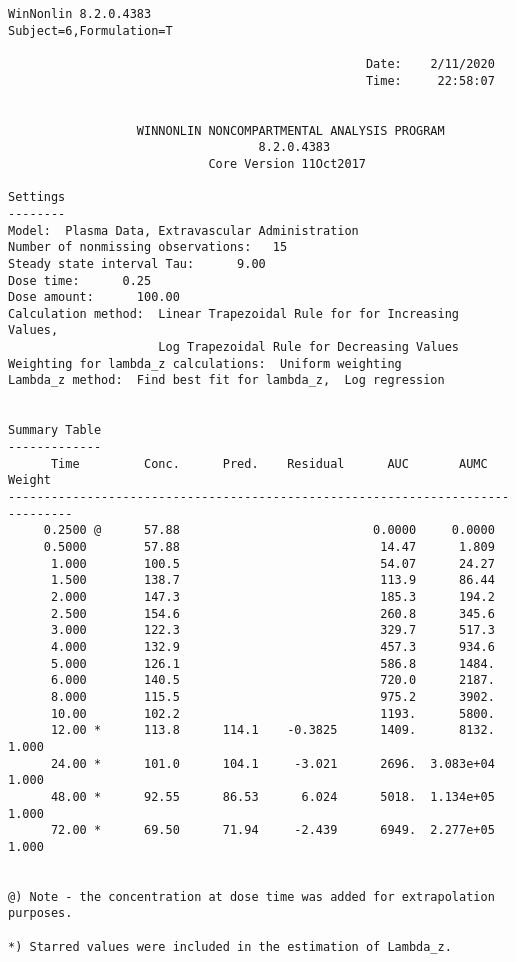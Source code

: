\documentclass[12pt,a4paper]{article}
\begin{document}
\begin{verbatim}
WinNonlin 8.2.0.4383
Subject=6,Formulation=T

                                                  Date:    2/11/2020
                                                  Time:     22:58:07


                  WINNONLIN NONCOMPARTMENTAL ANALYSIS PROGRAM
                                   8.2.0.4383
                            Core Version 11Oct2017

Settings
--------
Model:  Plasma Data, Extravascular Administration
Number of nonmissing observations:   15
Steady state interval Tau:      9.00
Dose time:      0.25
Dose amount:      100.00
Calculation method:  Linear Trapezoidal Rule for for Increasing Values,
                     Log Trapezoidal Rule for Decreasing Values
Weighting for lambda_z calculations:  Uniform weighting
Lambda_z method:  Find best fit for lambda_z,  Log regression


Summary Table
-------------
      Time         Conc.      Pred.    Residual      AUC       AUMC      Weight
-------------------------------------------------------------------------------
     0.2500 @      57.88                           0.0000     0.0000
     0.5000        57.88                            14.47      1.809
      1.000        100.5                            54.07      24.27
      1.500        138.7                            113.9      86.44
      2.000        147.3                            185.3      194.2
      2.500        154.6                            260.8      345.6
      3.000        122.3                            329.7      517.3
      4.000        132.9                            457.3      934.6
      5.000        126.1                            586.8      1484.
      6.000        140.5                            720.0      2187.
      8.000        115.5                            975.2      3902.
      10.00        102.2                            1193.      5800.
      12.00 *      113.8      114.1    -0.3825      1409.      8132.      1.000
      24.00 *      101.0      104.1     -3.021      2696.  3.083e+04      1.000
      48.00 *      92.55      86.53      6.024      5018.  1.134e+05      1.000
      72.00 *      69.50      71.94     -2.439      6949.  2.277e+05      1.000


@) Note - the concentration at dose time was added for extrapolation purposes.

*) Starred values were included in the estimation of Lambda_z.



\end{verbatim}
\end{document}
